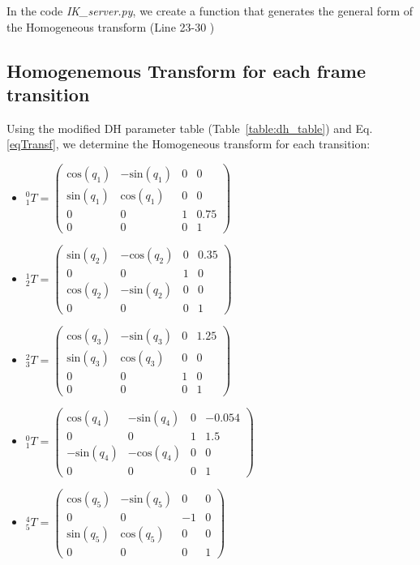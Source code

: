 \documentclass[a4paper,12pt]{report}
\begin{document}
In the code \textit{IK\_server.py}, we create a function that generates the general form of the Homogeneous transform (Line 23-30 )

\subsection{Homogenemous Transform for each frame transition}
Using the modified DH parameter table (Table~\ref{table:dh_table}) and Eq. \ref{eqTransf}, we determine the Homogeneous transform for each transition:

\begin{itemize}
\item $_1 ^0 T = \left( \begin{matrix} \text{cos}(q_1) & -\text{sin}(q_1) & 0 & 0 \\
\text{sin}(q_1) & \text{cos}(q_1) & 0 & 0 \\
0 & 0 & 1 & 0.75 \\
0 & 0 & 0 & 1
 \end{matrix} \right)$
 
\item $_2 ^1 T = \left( \begin{matrix} \text{sin}(q_2) & -\text{cos}(q_2) & 0 & 0.35 \\
0 & 0 & 1 & 0 \\
\text{cos}(q_2) & -\text{sin}(q_2) & 0 & 0 \\
0 & 0 & 0 & 1
 \end{matrix} \right)$
 
\item $_3 ^2 T = \left( \begin{matrix} \text{cos}(q_3) & -\text{sin}(q_3) & 0 & 1.25 \\
\text{sin}(q_3) & \text{cos}(q_3) & 0 & 0 \\
0 & 0 & 1 & 0 \\
0 & 0 & 0 & 1
 \end{matrix} \right)$
 
\item $_1 ^0 T = \left( \begin{matrix} \text{cos}(q_4) & -\text{sin}(q_4) & 0 & -0.054 \\
0 & 0 & 1 & 1.5 \\
-\text{sin}(q_4) & -\text{cos}(q_4) & 0 & 0 \\
0 & 0 & 0 & 1
 \end{matrix} \right)$
 
\item $_5 ^4 T = \left( \begin{matrix} \text{cos}(q_5) & -\text{sin}(q_5) & 0 & 0 \\
0 & 0 & -1 & 0 \\
\text{sin}(q_5) & \text{cos}(q_5) & 0 & 0 \\
0 & 0 & 0 & 1
 \end{matrix} \right)$


\end{itemize}
\end{document}
